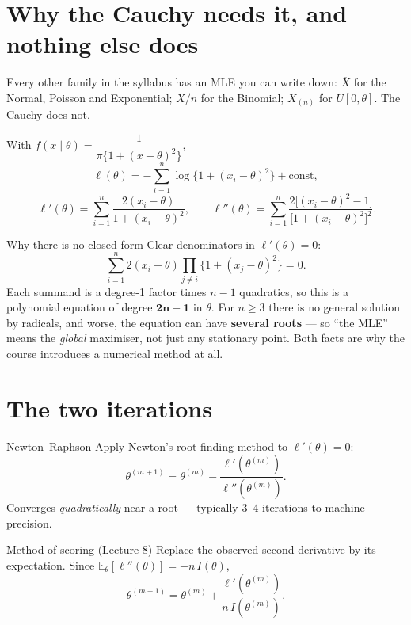 \documentclass[11pt]{article}
\newcommand{\E}{\mathbb{E}}
\newcommand{\Xbar}{\overline{X}}
\begin{document}
\section{Why the Cauchy needs it, and nothing else does}

Every other family in the syllabus has an MLE you can write down: $\Xbar$ for the Normal,
Poisson and Exponential; $X/n$ for the Binomial; $X_{(n)}$ for $U[0,\theta]$. The Cauchy does
not.

With $f(x\mid\theta)=\dfrac{1}{\pi\{1+(x-\theta)^2\}}$,
\[
\ell(\theta)=-\sum_{i=1}^n\log\big\{1+(x_i-\theta)^2\big\}+\text{const},
\]
\[
\boxed{\ \ell'(\theta)=\sum_{i=1}^n\frac{2(x_i-\theta)}{1+(x_i-\theta)^2},
\qquad
\ell''(\theta)=\sum_{i=1}^n\frac{2\big[(x_i-\theta)^2-1\big]}{\big[1+(x_i-\theta)^2\big]^2}. }
\]

\begin{idea}{Why there is no closed form}
Clear denominators in $\ell'(\theta)=0$:
\[
\sum_{i=1}^{n}2(x_i-\theta)\prod_{j\ne i}\big\{1+(x_j-\theta)^2\big\}=0 .
\]
Each summand is a degree-1 factor times $n-1$ quadratics, so this is a polynomial equation of
degree $\boldsymbol{2n-1}$ in $\theta$. For $n\ge3$ there is no general solution by radicals,
and worse, the equation can have \textbf{several roots} --- so ``the MLE'' means the
\emph{global} maximiser, not just any stationary point. Both facts are why the course
introduces a numerical method at all.
\end{idea}

\section{The two iterations}

\begin{idea}{Newton--Raphson}
Apply Newton's root-finding method to $\ell'(\theta)=0$:
\[
\theta^{(m+1)}=\theta^{(m)}-\frac{\ell'(\theta^{(m)})}{\ell''(\theta^{(m)})}.
\]
Converges \emph{quadratically} near a root --- typically 3--4 iterations to machine precision.
\end{idea}

\begin{idea}{Method of scoring (Lecture 8)}
Replace the observed second derivative by its expectation. Since
$\E_\theta[\ell''(\theta)]=-n\,I(\theta)$,
\[
\theta^{(m+1)}=\theta^{(m)}+\frac{\ell'(\theta^{(m)})}{n\,I(\theta^{(m)})}.
\]
\end{idea}
\end{document}
